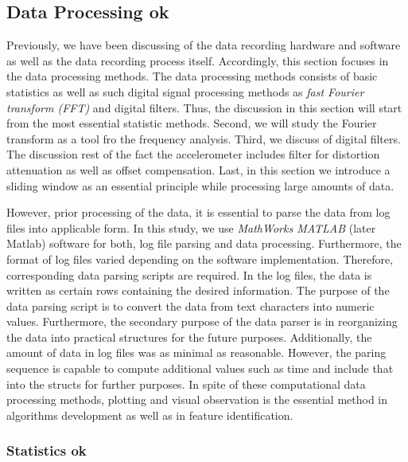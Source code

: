 \documentclass[english,12pt,a4paper,pdftex,elec,utf8]{aaltothesis}
\begin{document}
\subsection{Data Processing ok} \label{dataprocessingsection}

Previously, we have been discussing of the data recording hardware and software as well as the data recording process itself. Accordingly, this section focuses in the data processing methods. The data processing methods consists of basic statistics as well as such digital signal processing methods as \textit{fast Fourier transform (FFT)} and digital filters. Thus, the discussion in this section will start from the most essential statistic methods. Second, we will study the Fourier transform as a tool fro the frequency analysis. Third, we discuss of digital filters. The discussion rest of the fact the accelerometer includes filter for distortion attenuation as well as offset compensation. Last, in this section we introduce a sliding window as an essential principle while processing large amounts of data.

However, prior processing of the data, it is essential to parse the data from log files into applicable form. In this study, we use \textit{MathWorks MATLAB} (later Matlab) \cite{matlaboverview} software for both, log file parsing and data processing. Furthermore, the format of log files varied depending on the software implementation. Therefore, corresponding data parsing scripts are required. In the log files, the data is written as certain rows containing the desired information. The purpose of the data parsing script is to convert the data from text characters into numeric values. Furthermore, the secondary purpose of the data parser is in reorganizing the data into practical structures for the future purposes. Additionally, the amount of data in log files was as minimal as reasonable. However, the paring sequence is capable to compute additional values such as time and include that into the structs for further purposes. In spite of these computational data processing methods, plotting and visual observation is the essential method in algorithms development as well as in feature identification.

\subsubsection{Statistics ok} \label{statisticssection}
\end{document}
